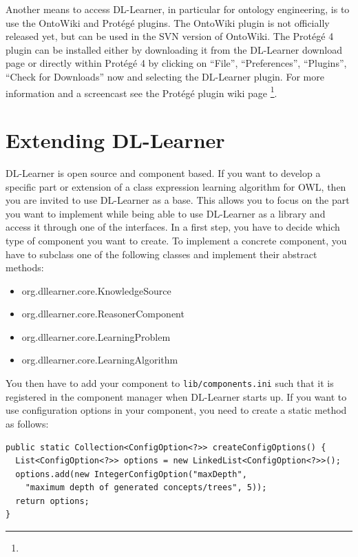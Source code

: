 \documentclass[a4paper,12pt]{scrartcl}
\begin{document}
Another means to access DL-Learner, in particular for ontology engineering, is to use the OntoWiki and Protégé plugins. The OntoWiki plugin is not officially released yet, but can be used in the SVN version of OntoWiki. The Protégé 4 plugin can be installed either by downloading it from the DL-Learner download page or directly within Protégé 4 by clicking on ``File'', ``Preferences'', ``Plugins'', ``Check for Downloads'' now and selecting the DL-Learner plugin. For more information and a screencast see the Protégé plugin wiki page \footnote{\wikiprotplugin}.

\section{Extending DL-Learner}
\label{sec:developing}

DL-Learner is open source and component based. If you want to develop a specific part or extension of a class expression learning algorithm for OWL, then you are invited to use DL-Learner as a base. This allows you to focus on the part you want to implement while being able to use DL-Learner as a library and access it through one of the interfaces. In a first step, you have to decide which type of component you want to create. To implement a concrete component, you have to subclass one of the following classes and implement their abstract methods:

\begin{itemize}
 \item org.dllearner.core.KnowledgeSource
 \item org.dllearner.core.ReasonerComponent
 \item org.dllearner.core.LearningProblem
 \item org.dllearner.core.LearningAlgorithm
\end{itemize}

You then have to add your component to \verb|lib/components.ini| such that it is registered in the component manager when DL-Learner starts up. If you want to use configuration options in your component, you need to create a static method as follows:

\begin{verbatim}
public static Collection<ConfigOption<?>> createConfigOptions() {
  List<ConfigOption<?>> options = new LinkedList<ConfigOption<?>>();
  options.add(new IntegerConfigOption("maxDepth", 
    "maximum depth of generated concepts/trees", 5));
  return options;
}
\end{verbatim}
\end{document}
